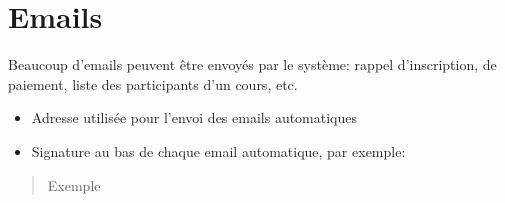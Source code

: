 \documentclass[letterpaper,10pt,english]{sphinxmanual}
\begin{document}
\section{Emails}
\label{\detokenize{configurer:emails}}
Beaucoup d’emails peuvent être envoyés par le système: rappel d’inscription, de paiement, liste des participants d’un cours, etc.
\begin{itemize}
\item {} 
Adresse utilisée pour l’envoi des emails automatiques

\item {} 
Signature au bas de chaque email automatique, par exemple:

\end{itemize}
\begin{quote}\begin{description}
\item[{Exemple}] \leavevmode
{}

\end{description}\end{quote}
\end{document}
